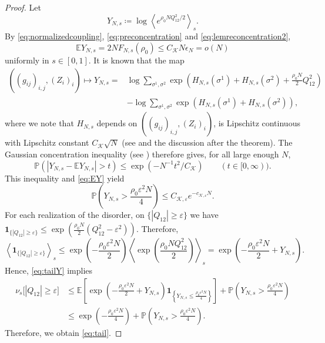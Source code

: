 \documentclass[11pt]{article}
\numberwithin{equation}{section}
\newcommand{\E}{\mathbb{E}}
\newcommand{\1}{\mathbf 1}
\newcommand{\cK}{\mathcal K}
\newcommand{\braket}[1]{\left\langle #1\right\rangle}
\begin{document}
\begin{proof}
Let
\[
 Y_{N,s}
 \coloneqq\log\braket{e^{\rho_0NQ_{12}^2/2}}_s.
\]
By \eqref{eq:normalizedcoupling}, \eqref{eq:preconcentration} and \eqref{eq:lemreconcentration2},
\begin{equation}\label{eq:EY}
 \E Y_{N,s}=2NF_{N,s}(\rho_0)
 \le C_{\cK} N\epsilon_N=o(N)
\end{equation}
uniformly in $s\in [0,1]$.
It is known that the map
\begin{align*}
((g_{ij})_{i,j}, (Z_i)_{i}) \mapsto Y_{N,s} = & \log
 \sum_{\sigma^1,\sigma^2}
 \exp\left(
 H_{N,s}(\sigma^1)+H_{N,s}(\sigma^2)
 +\frac{\rho _0 N}{2}Q_{12}^2\right) \\
&- \log
 \sum_{\sigma^1,\sigma^2}
 \exp\left(
 H_{N,s}(\sigma^1)+H_{N,s}(\sigma^2)
 \right) ,
\end{align*}
where we note that $H_{N,s}$ depends on $((g_{ij})_{i,j}, (Z_i)_{i})$, is Lipschitz continuous with Lipschitz constant $C_{\cK}\sqrt{N}$
(see \cite[Theorem~1.3.5]{Talagrand} and the discussion after the theorem).
The Gaussian concentration inequality
(see \cite[Theorem~1.3.4]{Talagrand})
therefore gives, for all
large enough $N$,
\[
 \mathbb P\left(
 |Y_{N,s} - \mathbb E Y_{N,s}|> t \right)
\le \exp \left( - N^{-1 } t^2/C_{\cK}  \right) \qquad (t\in [0,\infty )).
\]
This inequality and \eqref{eq:EY} yield
\begin{equation}\label{eq:tailY}
\mathbb P\left(
 Y_{N,s}>\frac{\rho_0\varepsilon^2N}{4}\right) \le C_{\cK,\varepsilon}e^{-c_{\cK,\varepsilon}N}.
\end{equation}
For each realization of the disorder, on $\{|Q_{12}|\ge\varepsilon\}$ we have
\(
\1_{\{|Q_{12}|\ge\varepsilon\}}
\le
\exp\left(
\frac{\rho_0N}{2}(Q_{12}^2-\varepsilon^2)
\right).
\) 
Therefore,
\[
\left\langle \1_{\{|Q_{12}|\ge\varepsilon\}}\right\rangle_s
\le
\exp\left(-\frac{\rho_0\varepsilon^2N}{2}\right)
\left\langle
\exp\left(\frac{\rho_0NQ_{12}^2}{2}\right)
\right\rangle_s
=
\exp\left(
-\frac{\rho_0\varepsilon^2N}{2}+Y_{N,s}
\right).
\]
Hence, 
\eqref{eq:tailY} implies
\begin{align*}
\nu_s\bigl[|Q_{12}|\ge\varepsilon\bigr]
&\le
\E\left[
\exp\left(
-\frac{\rho_0\varepsilon^2N}{2}+Y_{N,s}
\right)
\1_{\left\{Y_{N,s}\le \frac{\rho_0\varepsilon^2N}{4}\right\}}
\right]
+
\mathbb P\left(
Y_{N,s}>\frac{\rho_0\varepsilon^2N}{4}
\right)
\\
&\le
\exp\left(-\frac{\rho_0\varepsilon^2N}{4}\right)
+
\mathbb P\left(
Y_{N,s}>\frac{\rho_0\varepsilon^2N}{4}
\right).
\end{align*}
Therefore, we obtain \eqref{eq:tail}.
\end{proof}
\end{document}
